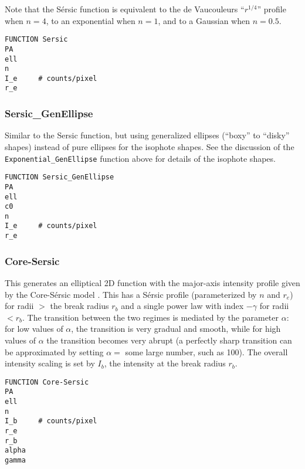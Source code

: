 \documentclass[10pt,a4paper,article]{memoir}
\begin{document}
Note that the S\'ersic function is equivalent to the de Vaucouleurs ``$r^{1/4}$'' profile
when $n = 4$, to an exponential when $n = 1$, and to a Gaussian when $n = 0.5$.

\begin{verbatim}
FUNCTION Sersic
PA
ell
n
I_e     # counts/pixel
r_e
\end{verbatim}


\subsubsection{Sersic\_GenEllipse}

Similar to the Sersic function, but using generalized ellipses (``boxy'' to
``disky'' shapes) instead of pure ellipses for the isophote shapes.  See the
discussion of the \texttt{Exponential\_GenEllipse} function above for details of the isophote
shapes.

\begin{verbatim}
FUNCTION Sersic_GenEllipse
PA
ell
c0
n
I_e     # counts/pixel
r_e
\end{verbatim}



\subsubsection{Core-Sersic}

This generates an elliptical 2D function with the major-axis intensity profile
given by the Core-S{\'e}rsic model \citep{graham03,trujillo04}. This has a
S\'ersic profile (parameterized by $n$ and $r_{e}$) for radii $>$ the break
radius $r_{b}$ and a single power law with index $-\gamma$ for radii $< r_{b}$.
The transition between the two regimes is mediated by the parameter $\alpha$:
for low values of $\alpha$, the transition is very gradual and smooth, while for
high values of $\alpha$ the transition becomes very abrupt (a perfectly sharp
transition can be approximated by setting $\alpha =$
some large number, such as 100). The overall intensity scaling is set by $I_{b}$,
the intensity at the break radius $r_{b}$.

\begin{verbatim}
FUNCTION Core-Sersic
PA
ell
n
I_b     # counts/pixel
r_e
r_b
alpha
gamma
\end{verbatim}



%
%
\end{document}

